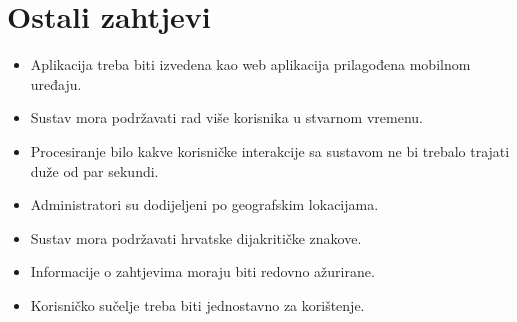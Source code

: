 				\newpage
				\eject
	
		\section{Ostali zahtjevi}
		
		\begin{itemize}
			\item Aplikacija treba biti izvedena kao web aplikacija prilagođena mobilnom uređaju.
			\item Sustav mora podržavati rad više korisnika u stvarnom vremenu.
			\item Procesiranje bilo kakve korisničke interakcije sa sustavom ne bi trebalo trajati duže od par sekundi.
			\item Administratori su dodijeljeni po geografskim lokacijama.
			\item Sustav mora podržavati hrvatske dijakritičke znakove.
			\item Informacije o zahtjevima moraju biti redovno ažurirane.
			\item Korisničko sučelje treba biti jednostavno za korištenje.
		\end{itemize}
			 
			 
			 
	